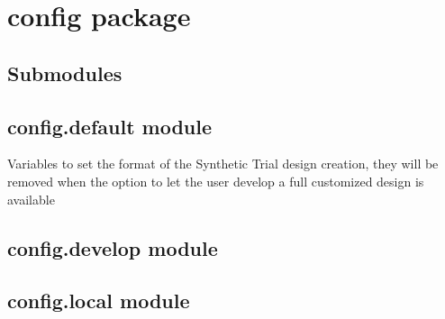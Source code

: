 \documentclass[letterpaper,10pt,english]{sphinxmanual}
\begin{document}
\section{config package}
\label{\detokenize{config:config-package}}\label{\detokenize{config::doc}}

\subsection{Submodules}
\label{\detokenize{config:submodules}}

\subsection{config.default module}
\label{\detokenize{config:module-config.default}}\label{\detokenize{config:config-default-module}}

\begin{fulllineitems}
\label{\detokenize{config:config.default.CT_RANDOMIZE_PROVIDER}}
\sphinxAtStartPar
Variables to set the format of the Synthetic Trial design creation, 
they will be removed when the option to let the user develop a full customized design is available

\end{fulllineitems}



\subsection{config.develop module}
\label{\detokenize{config:module-config.develop}}\label{\detokenize{config:config-develop-module}}

\subsection{config.local module}
\label{\detokenize{config:module-config.local}}\label{\detokenize{config:config-local-module}}
\end{document}
